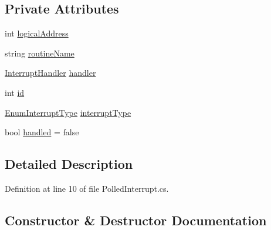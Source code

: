 \subsection*{Private Attributes}
\begin{DoxyCompactItemize}
\item 
int \hyperlink{class_c_p_u___o_s___simulator_1_1_c_p_u_1_1_interrupts_1_1_polled_interrupt_aa6323958769981e464a31ae232bdf674}{logical\+Address}
\item 
string \hyperlink{class_c_p_u___o_s___simulator_1_1_c_p_u_1_1_interrupts_1_1_polled_interrupt_aae22e2a06e7fe7a29de97a719c31432b}{routine\+Name}
\item 
\hyperlink{class_c_p_u___o_s___simulator_1_1_c_p_u_1_1_interrupts_1_1_interrupt_handler}{Interrupt\+Handler} \hyperlink{class_c_p_u___o_s___simulator_1_1_c_p_u_1_1_interrupts_1_1_polled_interrupt_ae7228477097987fa61e837479bad2696}{handler}
\item 
int \hyperlink{class_c_p_u___o_s___simulator_1_1_c_p_u_1_1_interrupts_1_1_polled_interrupt_ae44966c8438ace0a6cb6ac5d670b391b}{id}
\item 
\hyperlink{namespace_c_p_u___o_s___simulator_1_1_c_p_u_1_1_interrupts_a575a43213ed6d54083da8956c5a69b39}{Enum\+Interrupt\+Type} \hyperlink{class_c_p_u___o_s___simulator_1_1_c_p_u_1_1_interrupts_1_1_polled_interrupt_a9488f8def40cec7cd7f0f6dfb1f56429}{interrupt\+Type}
\item 
bool \hyperlink{class_c_p_u___o_s___simulator_1_1_c_p_u_1_1_interrupts_1_1_polled_interrupt_a25751ed2a2b610d3883e8c6e7197d89d}{handled} = false
\end{DoxyCompactItemize}


\subsection{Detailed Description}


Definition at line 10 of file Polled\+Interrupt.\+cs.



\subsection{Constructor \& Destructor Documentation}
\hypertarget{class_c_p_u___o_s___simulator_1_1_c_p_u_1_1_interrupts_1_1_polled_interrupt_aceea1d043ea479a2bf84f64d340d1179}{}
